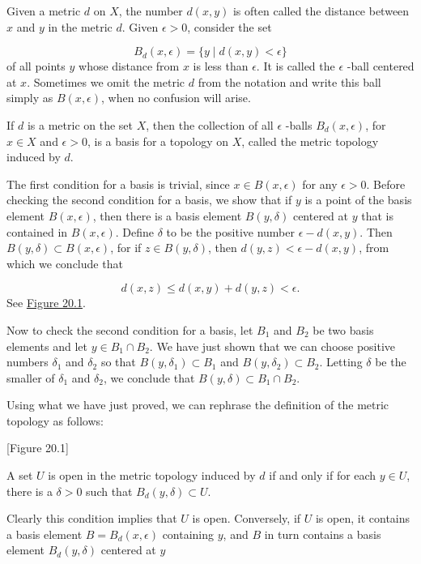 Given a metric \(d\) on \(X\), the number \(d( {x,y})\) is often called the distance between \(x\) and \(y\) in the metric \(d\). Given \(\epsilon > 0\), consider the set

\[
B_{d}( {x,\epsilon }) = \{ y \mid d( {x,y}) < \epsilon \}
\]
of all points \(y\) whose distance from \(x\) is less than \(\epsilon\). It is called the \(\epsilon\) -ball centered at \(x\). Sometimes we omit the metric \(d\) from the notation and write this ball simply as \( B( {x,\epsilon })\), when no confusion will arise.

\begin{definition}
 If \(d\) is a metric on the set \(X\), then the collection of all \(\epsilon\) -balls \(B_{d}( {x,\epsilon })\), for \(x \in X\) and \(\epsilon > 0\), is a basis for a topology on \(X\), called the metric topology induced by \(d\).
\end{definition}

The first condition for a basis is trivial, since \(x \in B( {x,\epsilon })\) for any \(\epsilon > 0\). Before checking the second condition for a basis, we show that if \(y\) is a point of the basis element \(B( {x,\epsilon })\), then there is a basis element \(B( {y,\delta })\) centered at \(y\) that is contained in \(B( {x,\epsilon })\). Define \(\delta\) to be the positive number \(\epsilon - d( {x,y})\). Then \(B( {y,\delta }) \subset B( {x,\epsilon })\), for if \(z \in B( {y,\delta })\), then \(d( {y,z}) < \epsilon - d( {x,y})\), from which we conclude that

\[
d( {x,z}) \leq d( {x,y}) + d( {y,z}) < \epsilon .
\]
See \hyperref[fig:20.1]{Figure 20.1}.

Now to check the second condition for a basis, let \(B_{1}\) and \(B_{2}\) be two basis elements and let \(y \in {B}_{1} \cap {B}_{2}\). We have just shown that we can choose positive numbers \({\delta }_{1}\) and \({\delta }_{2}\) so that \(B( {y,{\delta }_{1}}) \subset {B}_{1}\) and \(B( {y,{\delta }_{2}}) \subset {B}_{2}\). Letting \(\delta\) be the smaller of \({\delta }_{1}\) and \({\delta }_{2}\), we conclude that \(B( {y,\delta }) \subset {B}_{1} \cap {B}_{2}\).

Using what we have just proved, we can rephrase the definition of the metric topology as follows:

[Figure 20.1]
\begin{centeredblock}
 A set \(U\) is open in the metric topology induced by \(d\) if and only if for each \(y \in U\), there is a \(\delta > 0\) such that \(B_{d}( {y,\delta }) \subset U\).
\end{centeredblock}
Clearly this condition implies that \(U\) is open. Conversely, if \(U\) is open, it contains a basis element \(B = B_{d}( {x,\epsilon })\) containing \(y\), and \(B\) in turn contains a basis element \(B_{d}( {y,\delta })\) centered at \(y\)

